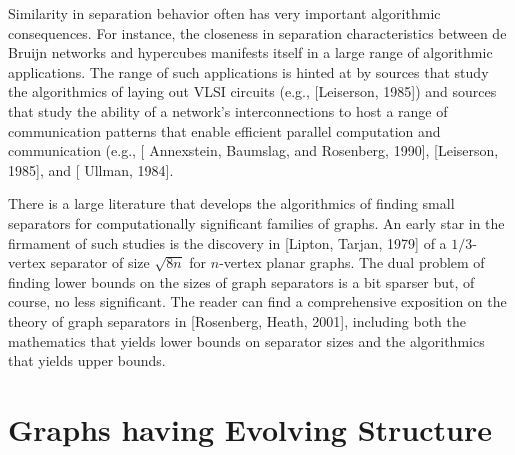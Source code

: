 \smallskip

Similarity in separation behavior often has very important algorithmic consequences.  For instance, the closeness in separation characteristics between de Bruijn networks and hypercubes manifests itself in a large range of algorithmic applications.  The range of such applications is hinted at by sources that study the algorithmics of laying out VLSI circuits (e.g., [Leiserson, 1985]) and sources that study the ability of a network's interconnections to host a range of communication patterns that enable efficient parallel computation and communication (e.g., [ Annexstein, Baumslag, and Rosenberg, 1990], [Leiserson, 1985], and [ Ullman, 1984].

\medskip

There is a large literature that develops the algorithmics of finding small separators for computationally significant families of graphs.  An early star in the firmament of such studies is the discovery in [Lipton, Tarjan, 1979] of a $1/3$-vertex separator of size $\sqrt{8n}$ for $n$-vertex planar graphs.  The dual problem of finding lower bounds on the sizes of graph separators is a bit sparser but, of course, no less significant.  The reader can find a comprehensive exposition on the theory of graph separators in [Rosenberg, Heath, 2001], including both the mathematics that yields lower bounds on separator sizes and the algorithmics that yields upper bounds.


\section{Graphs having Evolving Structure}
\label{sec:graph-evolve}

